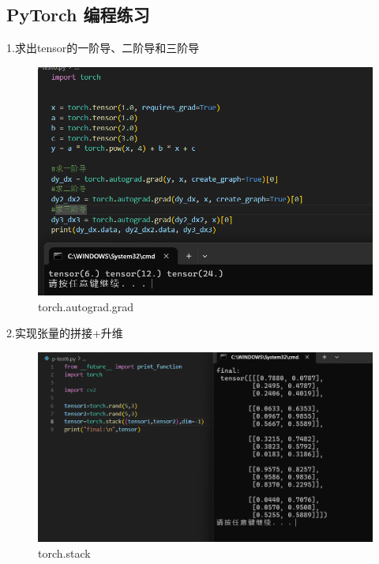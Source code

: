 \documentclass[a4paper, 12pt]{article}
\begin{document}
\subsection{PyTorch 编程练习}
1.求出tensor的一阶导、二阶导和三阶导
\begin{figure}[H]
  \centering
  \includegraphics[width=\textwidth]{屏幕截图 2024-09-15 110908.png}
  \caption{torch.autograd.grad}
\end{figure}

2.实现张量的拼接+升维
\begin{figure}[H]
  \centering
  \includegraphics[width=\textwidth]{屏幕截图 2024-09-15 110619.png}
  \caption{torch.stack}
\end{figure}
\end{document}
